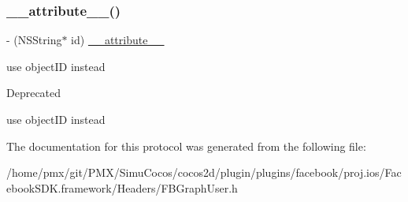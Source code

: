 \subsubsection{\texorpdfstring{\+\_\+\+\_\+attribute\+\_\+\+\_\+()}{\_\_attribute\_\_()}\hspace{0.1cm}{\footnotesize\ttfamily [5/5]}}
{\footnotesize\ttfamily -\/ (N\+S\+String$\ast$ id) \hyperlink{struct____attribute____}{\+\_\+\+\_\+attribute\+\_\+\+\_\+} \begin{DoxyParamCaption}\item[{((deprecated(\char`\"{}use object\+ID instead\char`\"{})))}]{ }\end{DoxyParamCaption}}

use object\+ID instead \begin{DoxyRefDesc}{Deprecated}
\item[\hyperlink{deprecated__deprecated000207}{Deprecated}]use object\+ID instead \end{DoxyRefDesc}


The documentation for this protocol was generated from the following file\+:\begin{DoxyCompactItemize}
\item 
/home/pmx/git/\+P\+M\+X/\+Simu\+Cocos/cocos2d/plugin/plugins/facebook/proj.\+ios/\+Facebook\+S\+D\+K.\+framework/\+Headers/F\+B\+Graph\+User.\+h\end{DoxyCompactItemize}
